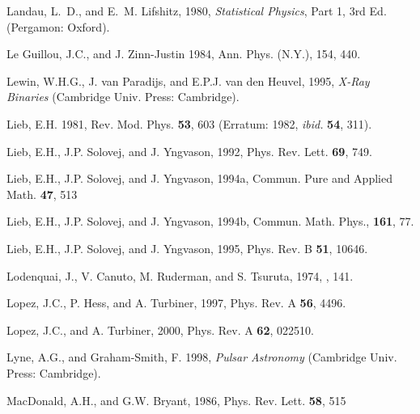\begin{references}
\harvarditem{}{}{}
Landau, L.~D., and E.~M. Lifshitz, 1980, {\it Statistical Physics}, Part 1, 
3rd Ed. (Pergamon: Oxford).

\harvarditem{}{}{}
Le Guillou, J.C., and J. Zinn-Justin 1984, Ann. Phys. (N.Y.), 154, 440.

\harvarditem{}{}{}
Lewin, W.H.G., J. van Paradijs, and E.P.J. van den Heuvel, 1995, 
{\it X-Ray Binaries} (Cambridge Univ. Press: Cambridge).

\harvarditem{}{}{}
Lieb, E.H. 1981, Rev. Mod. Phys. {\bf 53}, 603 (Erratum: 1982, {\it ibid.}
{\bf 54}, 311).

\harvarditem{}{}{}
Lieb, E.H., J.P. Solovej, and J. Yngvason, 1992,
Phys. Rev. Lett. {\bf 69}, 749.

\harvarditem{}{}{}
Lieb, E.H., J.P. Solovej, and J. Yngvason, 1994a,
Commun. Pure and Applied Math. {\bf 47}, 513

\harvarditem{}{}{}
Lieb, E.H., J.P. Solovej, and J. Yngvason, 1994b,
Commun. Math. Phys., {\bf 161}, 77.

\harvarditem{}{}{}
Lieb, E.H., J.P. Solovej, and J. Yngvason, 1995, Phys. Rev. B {\bf 51}, 10646.


\harvarditem{}{}{}
Lodenquai, J., V. Canuto, M. Ruderman, and S. Tsuruta, 1974, 
, 141.

\harvarditem{}{}{}
Lopez, J.C., P. Hess, and A. Turbiner, 1997, Phys. Rev. A {\bf 56}, 4496.

\harvarditem{}{}{}
Lopez, J.C., and A. Turbiner, 2000, Phys. Rev. A {\bf 62}, 022510.

\harvarditem{}{}{}
Lyne, A.G., and Graham-Smith, F. 1998, {\it Pulsar Astronomy}
(Cambridge Univ. Press: Cambridge). 


\harvarditem{}{}{}
MacDonald, A.H., and G.W. Bryant, 1986, Phys. Rev. Lett. {\bf 58}, 515


\end{references}
